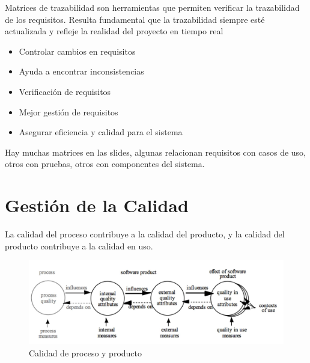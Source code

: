 {Matrices de trazabilidad son herramientas que permiten verificar la trazabilidad de los requisitos. Resulta fundamental que la trazabilidad siempre esté actualizada y refleje la realidad del proyecto en tiempo real\ns
\begin{itemize}
	\item Controlar cambios en requisitos
	\item Ayuda a encontrar inconsistencias
	\item Verificación de requisitos
	\item Mejor gestión de requisitos
	\item Asegurar eficiencia y calidad para el sistema
\end{itemize}}

Hay muchas matrices en las slides, algunas relacionan requisitos con casos de uso, otros con pruebas, otros con componentes del sistema.



\section{Gestión de la Calidad}
La calidad del proceso contribuye a la calidad del producto, y la calidad del producto contribuye a la calidad en uso.

\begin{figure}[htbp]
   \centering
   \includegraphics{images/01/productoCalidad.png}
   \caption{Calidad de proceso y producto}
   \label{fig:01/productoCalidad}
\end{figure}

